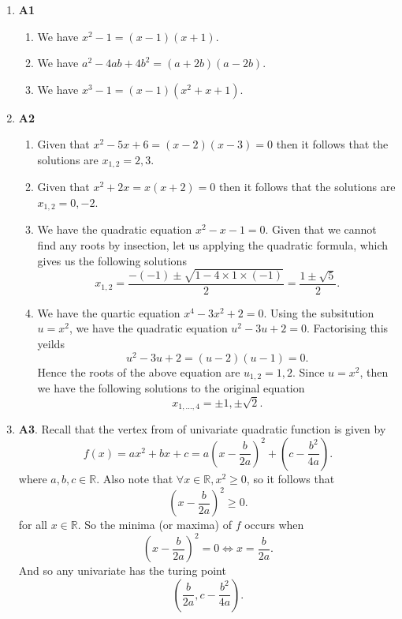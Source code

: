 \documentclass[12pt,oneside]{book}
\begin{document}
    \begin{enumerate}
        \item \textbf{A1} \begin{enumerate}
            \item We have $x ^2 - 1 = (x - 1)(x + 1)$.
            \item We have $a^2 - 4ab + 4b^2 = (a + 2b)(a - 2b)$.
            \item We have $x ^3 - 1 = (x - 1)(x^2 + x + 1)$.
        \end{enumerate}
        \item \textbf{A2} \begin{enumerate}
            \item Given that $x^2 - 5x + 6 = (x-2)(x-3) = 0$ then it follows that the solutions are $x_{1,2} = 2, 3$.
            \item Given that $x^2 + 2x = x (x+2) = 0$ then it follows that the solutions are $x_{1,2} = 0, -2$.
            \item We have the quadratic equation $x^2 - x - 1 = 0$. Given that we cannot find any roots by insection, let us applying the quadratic formula, which gives us the following solutions \[
                x_{1,2} = \frac{-(-1) \pm \sqrt{1 - 4 \times 1 \times (-1) } }{2} = \frac{1 \pm \sqrt{5}}{2}
            .\]  
            \item We have the quartic equation $x^4 - 3x^2 + 2 = 0$. Using the subsitution $u = x^2$, we have the quadratic equation $u^2 - 3u + 2 = 0$. Factorising this yeilds \[
                u^2 - 3u + 2 = (u - 2) (u - 1) = 0
            .\]
            Hence the roots of the above equation are $u_{1,2} = 1, 2$. Since $u = x^2$, then we have the following solutions to the original equation \[
                x_{1,\ldots,4} = \pm 1, \pm \sqrt{2}
            .\]     
        \end{enumerate}
        \item \textbf{A3}. Recall that the vertex from of univariate quadratic function is given by \[
            f(x) = ax^2 + bx + c = a \left( x - \frac{b}{2a} \right)^2 + \left( c - \frac{b^2}{4a} \right)
        .\] where $a, b, c \in \mathbb{R}$. Also note that $\forall x \in \mathbb{R}, x^2 \geq 0$, so it follows that \[
            \left( x - \frac{b}{2a} \right)^2 \geq 0
        .\] for all $x \in \mathbb{R}$. So the minima (or maxima) of $f$ occurs when \[
            \left( x - \frac{b}{2a} \right)^2 = 0 \iff x = \frac{b}{2a}
        .\] And so any univariate has the turing point \[
            \left( \frac{b}{2a},  c - \frac{b^2}{4a}\right)
        .\] 
        

\end{enumerate}
\end{document}
